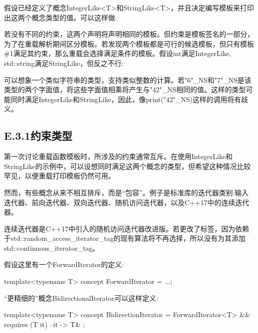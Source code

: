 
假设已经定义了概念IntegerLike<T>和StringLike<T>，并且决定编写模板来打印出这两个概念类型的值。可以这样做:


若没有不同的约束，这两个声明将声明相同的模板。但约束是模板签名的一部分，为了在重载解析期间区分模板。若发现两个模板都是可行的候选模板，但只有模板\#1满足其约束，那么重载会选择满足条件的模板。假设int满足IntegerLike, std::string满足StringLike，但反之不行:


可以想象一个类似字符串的类型，支持类似整数的计算。若"6"\_NS和"7"\_NS是该类型的两个字面值，将这些字面值相乘将产生与"42"\_NS相同的值。这样的类型可能同时满足IntegerLike和StringLike，因此，像print("42"\_NS)这样的调用将有歧义。

\subsection{E.3.1\hspace{0.2cm}约束类型}

第一次讨论重载函数模板时，所涉及的约束通常互斥。在使用IntegerLike和StringLike的示例中，可以设想同时满足这两个概念的类型，但希望这种情况比较罕见，以便重载打印模板仍然可用。

然而，有些概念从来不相互排斥，而是“包容”。例子是标准库的迭代器类别:输入迭代器、前向迭代器、双向迭代器、随机访问迭代器，以及C++17中的连续迭代器。

\begin{notice}连续迭代器是C++17中引入的随机访问迭代器改进版。若更改了标签，因为依赖于std::random\_access\_iterator\_tag的现有算法将不再选择，所以没有为其添加std::continuous\_iterator\_tag。
\end{notice}

假设这里有一个ForwardIterator的定义:

\begin{cpp}
template<typename T>
	concept ForwardIterator = ...;
\end{cpp}

“更精细的”概念BidirectionalIterator可以这样定义:

\begin{cpp}
template<typename T>
	concept BidirectionIterator =
		ForwardIterator<T> &&
		requires (T it) {
			{ --it } -> T&
		};
\end{cpp}

